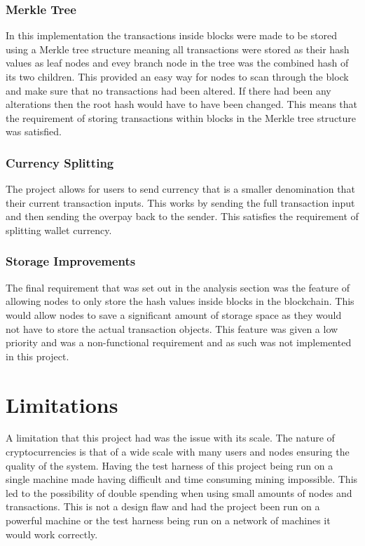 \documentclass{l4proj}
\begin{document}
\subsubsection{Merkle Tree}
In this implementation the transactions inside blocks were made to be stored using a Merkle tree structure meaning
all transactions were stored as their hash values as leaf nodes and evey branch node in the tree was the combined hash
of its two children. This provided an easy way for nodes to scan through the block and make sure that no transactions
had been altered. If there had been any alterations then the root hash would have to have been changed. This means
that the requirement of storing transactions within blocks in the Merkle tree structure was satisfied.
\subsubsection{Currency Splitting}
The project allows for users to send currency that is a smaller denomination that their current transaction inputs. This
works by sending the full transaction input and then sending the overpay back to the sender. This satisfies the 
requirement of splitting wallet currency.
\subsubsection{Storage Improvements}
The final requirement that was set out in the analysis section was the feature of allowing nodes to only store the
hash values inside blocks in the blockchain. This would allow nodes to save a significant amount of storage space as
they would not have to store the actual transaction objects. This feature was given a low priority and was a 
non-functional requirement and as such was not implemented in this project.

\section{Limitations}
A limitation that this project had was the issue with its scale. The nature of cryptocurrencies is
that of a wide scale with many users and nodes ensuring the quality of the system. Having the test harness of this
project being run on a single machine made having difficult and time consuming mining impossible. This led to the possibility of
double spending when using small amounts of nodes and transactions. This is not a design flaw and had the project
been run on a powerful machine or the test harness being run on a network of machines it would work correctly.
\end{document}
